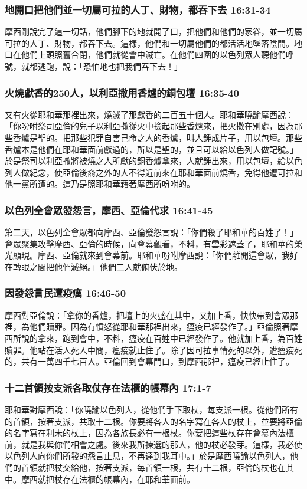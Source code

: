 \subsubsection{地開口把他們並一切屬可拉的人丁、財物，都吞下去 16:31-34}
摩西剛說完了這一切話，他們腳下的地就開了口，把他們和他們的家眷，並一切屬可拉的人丁、財物，都吞下去。這樣，他們和一切屬他們的都活活地墜落陰間。地口在他們上頭照舊合閉，他們就從會中滅亡。在他們四圍的以色列眾人聽他們呼號，就都逃跑，說：「恐怕地也把我們吞下去！」

\subsubsection{火燒獻香的250人，以利亞撒用香爐的銅包壇 16:35-40}
又有火從耶和華那裡出來，燒滅了那獻香的二百五十個人。耶和華曉諭摩西說：「你吩咐祭司亞倫的兒子以利亞撒從火中撿起那些香爐來，把火撒在別處，因為那些香爐是聖的。把那些犯罪自害己命之人的香爐，叫人錘成片子，用以包壇。那些香爐本是他們在耶和華面前獻過的，所以是聖的，並且可以給以色列人做記號。」於是祭司以利亞撒將被燒之人所獻的銅香爐拿來，人就錘出來，用以包壇，給以色列人做紀念，使亞倫後裔之外的人不得近前來在耶和華面前燒香，免得他遭可拉和他一黨所遭的。這乃是照耶和華藉著摩西所吩咐的。

\subsubsection{以色列全會眾發怨言，摩西、亞倫代求 16:41-45}
第二天，以色列全會眾都向摩西、亞倫發怨言說：「你們殺了耶和華的百姓了！」會眾聚集攻擊摩西、亞倫的時候，向會幕觀看，不料，有雲彩遮蓋了，耶和華的榮光顯現。摩西、亞倫就來到會幕前。耶和華吩咐摩西說：「你們離開這會眾，我好在轉眼之間把他們滅絕。」他們二人就俯伏於地。 

\subsubsection{因發怨言民遭疫癘 16:46-50}
摩西對亞倫說：「拿你的香爐，把壇上的火盛在其中，又加上香，快快帶到會眾那裡，為他們贖罪。因為有憤怒從耶和華那裡出來，瘟疫已經發作了。」亞倫照著摩西所說的拿來，跑到會中，不料，瘟疫在百姓中已經發作了。他就加上香，為百姓贖罪。他站在活人死人中間，瘟疫就止住了。除了因可拉事情死的以外，遭瘟疫死的，共有一萬四千七百人。亞倫回到會幕門口，到摩西那裡，瘟疫已經止住了。

\subsubsection{十二首領按支派各取仗存在法櫃的帳幕內 17:1-7}
耶和華對摩西說：「你曉諭以色列人，從他們手下取杖，每支派一根。從他們所有的首領，按著支派，共取十二根。你要將各人的名字寫在各人的杖上，並要將亞倫的名字寫在利未的杖上，因為各族長必有一根杖。你要把這些杖存在會幕內法櫃前，就是我與你們相會之處。後來我所揀選的那人，他的杖必發芽。這樣，我必使以色列人向你們所發的怨言止息，不再達到我耳中。」於是摩西曉諭以色列人，他們的首領就把杖交給他，按著支派，每首領一根，共有十二根，亞倫的杖也在其中。摩西就把杖存在法櫃的帳幕內，在耶和華面前。

